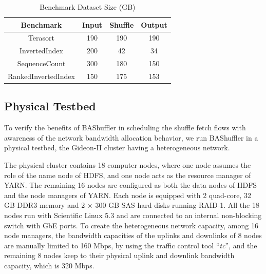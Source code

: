 \documentclass[10pt,journal,compsoc]{IEEEtran}
\begin{document}
\begin{table}[!t]
\renewcommand{\arraystretch}{1}
\caption{Benchmark Dataset Size (GB)}
\label{table:benchmark}
\centering
\begin{tabularx}{.4\textwidth}{c||c|c|c}
\hline
\textbf{Benchmark} & \textbf{Input} & \textbf{Shuffle} & \textbf{Output} \\
\hline
Terasort & 190 & 190 & 190\\
\hline
InvertedIndex & 200 & 42 & 34 \\
\hline
SequenceCount & 300 & 180 & 150 \\
\hline
RankedInvertedIndex & 150 & 175 & 153\\
\hline
\end{tabularx}
\end{table}

\subsection{Physical Testbed}
To verify the benefits of BAShuffler in scheduling the shuffle fetch
flows with awareness of the network bandwidth allocation behavior,
we run BAShuffler in a physical testbed, the
Gideon-II cluster \cite{gideon} having a heterogeneous network.


The physical cluster contains 18 computer nodes, where one node
assumes the role of the name node of HDFS, and
one node acts as the resource manager of YARN. 
The remaining 16 nodes are configured as both the data nodes of HDFS
and the node managers of YARN.
Each node is equipped with 2 quad-core, 32 GB DDR3 memory and
2 $\times$ 300 GB SAS hard disks running RAID-1. 
All the 18 nodes run with Scientific Linux 5.3 and are connected to an internal non-blocking switch with GbE ports. 
To create the heterogeneous network capacity, among 16 node managers, 
the bandwidth capacities of the uplinks and downlinks of 8 nodes are
manually limited to 160 Mbps,
by using the traffic control tool ``\emph{tc}'', 
and the remaining 8 nodes keep to their physical uplink and downlink
bandwidth capacity, which is 320 Mbps.
\end{document}
